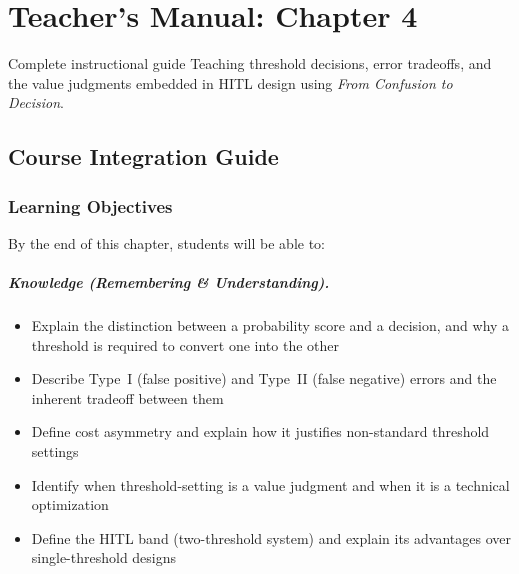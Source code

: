 
\chapter{Teacher's Manual: Chapter 4}
\label{ch:teacher-ch04}

\begin{chapterquote}{Complete instructional guide}
Teaching threshold decisions, error tradeoffs, and the value judgments embedded in HITL design using \emph{From Confusion to Decision}.
\end{chapterquote}

\section{Course Integration Guide}

\subsection{Learning Objectives}

By the end of this chapter, students will be able to:

\paragraph{Knowledge (Remembering \& Understanding).}
\begin{itemize}
    \item Explain the distinction between a probability score and a decision, and why a threshold is required to convert one into the other
    \item Describe Type~I (false positive) and Type~II (false negative) errors and the inherent tradeoff between them
    \item Define cost asymmetry and explain how it justifies non-standard threshold settings
    \item Identify when threshold-setting is a value judgment and when it is a technical optimization
    \item Define the HITL band (two-threshold system) and explain its advantages over single-threshold designs
\end{itemize}

